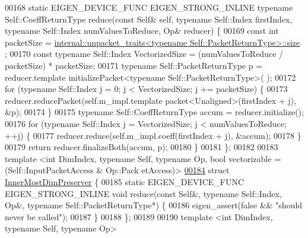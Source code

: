 \begin{DoxyCode}
00168   \textcolor{keyword}{static} EIGEN\_DEVICE\_FUNC EIGEN\_STRONG\_INLINE \textcolor{keyword}{typename} Self::CoeffReturnType reduce(\textcolor{keyword}{const} Self& \textcolor{keyword}{self}, \textcolor{keyword}{
      typename} Self::Index firstIndex, \textcolor{keyword}{typename} Self::Index numValuesToReduce, Op& reducer) \{
00169     \textcolor{keyword}{const} \textcolor{keywordtype}{int} packetSize = 
      \hyperlink{struct_eigen_1_1internal_1_1unpacket__traits}{internal::unpacket\_traits<typename Self::PacketReturnType>::size}
      ;
00170     \textcolor{keyword}{const} \textcolor{keyword}{typename} Self::Index VectorizedSize = (numValuesToReduce / packetSize) * packetSize;
00171     \textcolor{keyword}{typename} Self::PacketReturnType p = reducer.template initializePacket<typename Self::PacketReturnType>(
      );
00172     \textcolor{keywordflow}{for} (\textcolor{keyword}{typename} Self::Index j = 0; j < VectorizedSize; j += packetSize) \{
00173       reducer.reducePacket(\textcolor{keyword}{self}.m\_impl.template packet<Unaligned>(firstIndex + j), &p);
00174     \}
00175     \textcolor{keyword}{typename} Self::CoeffReturnType accum = reducer.initialize();
00176     \textcolor{keywordflow}{for} (\textcolor{keyword}{typename} Self::Index j = VectorizedSize; j < numValuesToReduce; ++j) \{
00177       reducer.reduce(\textcolor{keyword}{self}.m\_impl.coeff(firstIndex + j), &accum);
00178     \}
00179     \textcolor{keywordflow}{return} reducer.finalizeBoth(accum, p);
00180   \}
00181 \};
00182 
00183 \textcolor{keyword}{template} <\textcolor{keywordtype}{int} DimIndex, \textcolor{keyword}{typename} Self, \textcolor{keyword}{typename} Op, \textcolor{keywordtype}{bool} vectorizable = (Self::InputPacketAccess & Op::Pack
      etAccess)>
\hyperlink{struct_eigen_1_1internal_1_1_inner_most_dim_preserver}{00184} \textcolor{keyword}{struct }\hyperlink{struct_eigen_1_1internal_1_1_inner_most_dim_preserver}{InnerMostDimPreserver} \{
00185   \textcolor{keyword}{static} EIGEN\_DEVICE\_FUNC EIGEN\_STRONG\_INLINE \textcolor{keywordtype}{void} reduce(\textcolor{keyword}{const} Self&, \textcolor{keyword}{typename} Self::Index, Op&, \textcolor{keyword}{typename}
       Self::PacketReturnType*) \{
00186     eigen\_assert(\textcolor{keyword}{false} && \textcolor{stringliteral}{"should never be called"});
00187   \}
00188 \};
00189 
00190 \textcolor{keyword}{template} <\textcolor{keywordtype}{int} DimIndex, \textcolor{keyword}{typename} Self, \textcolor{keyword}{typename} Op>

\end{DoxyCode}
